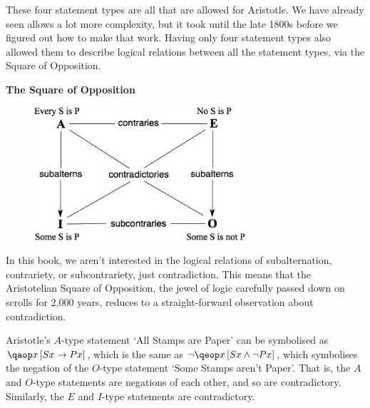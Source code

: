 \documentclass[PHIL101-Textbook.tex]{subfiles}
\begin{document}
These four statement types are all that are allowed for Aristotle. We have already seen \pl allows a lot more complexity, but it took until the late 1800s before we figured out how to make that work. Having only four statement types also allowed them to describe logical relations between all the statement types, via the Square of Opposition.

\pagebreak
\textbf{The Square of Opposition}

\begin{figure}[ht!]
\includegraphics[width=0.7\textwidth]{SquareOfOpposition.jpg}
\end{figure}

In this book, we aren't interested in the logical relations of subalternation, contrariety, or subcontrariety, just contradiction. %
This means that the Aristotelian Square of Opposition, the jewel of logic carefully passed down on scrolls for 2,000 years, reduces to a straight-forward observation about contradiction. %

Aristotle's  $A$-type statement `All Stamps are Paper' can be symbolised as $\qab{x}{Sx \eif Px}$, which is the same as $\enot\qeb{x}{Sx \eand \enot Px}$, which symbolises the negation of the $O$-type statement `Some Stamps aren't Paper'. That is, the $A$ and $O$-type statements are negations of each other, and so are  contradictory. 
Similarly, the $E$ and $I$-type statements are contradictory.


\end{document}
